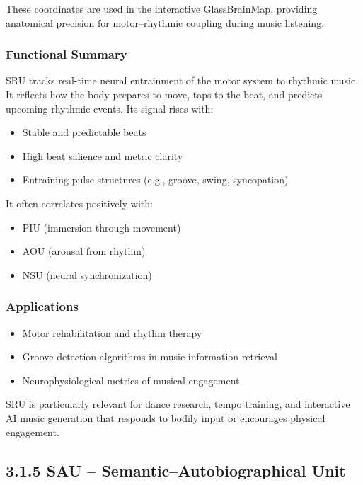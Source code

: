 These coordinates are used in the interactive GlassBrainMap, providing anatomical precision for motor–rhythmic coupling during music listening.

\subsubsection*{Functional Summary}

SRU tracks real-time neural entrainment of the motor system to rhythmic music. It reflects how the body prepares to move, taps to the beat, and predicts upcoming rhythmic events. Its signal rises with:

\begin{itemize}
    \item Stable and predictable beats
    \item High beat salience and metric clarity
    \item Entraining pulse structures (e.g., groove, swing, syncopation)
\end{itemize}

It often correlates positively with:

\begin{itemize}
    \item PIU (immersion through movement)
    \item AOU (arousal from rhythm)
    \item NSU (neural synchronization)
\end{itemize}

\subsubsection*{Applications}

\begin{itemize}
    \item Motor rehabilitation and rhythm therapy
    \item Groove detection algorithms in music information retrieval
    \item Neurophysiological metrics of musical engagement
\end{itemize}

SRU is particularly relevant for dance research, tempo training, and interactive AI music generation that responds to bodily input or encourages physical engagement.

\subsection*{3.1.5 SAU – Semantic–Autobiographical Unit}

